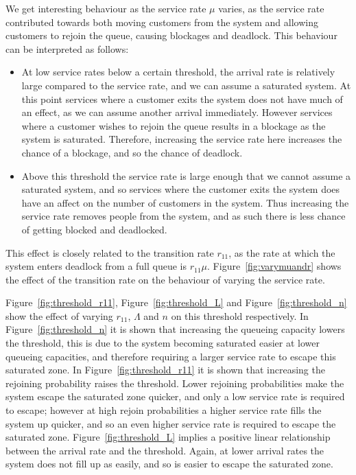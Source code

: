 \documentclass{article}
\begin{document}
We get interesting behaviour as the service rate $\mu$ varies, as the service rate contributed towards both moving customers from the system and allowing customers to rejoin the queue, causing blockages and deadlock.
This behaviour can be interpreted as follows:
\begin{itemize}
\item At low service rates below a certain threshold, the arrival rate is relatively large compared to the service rate, and we can assume a saturated system.
At this point services where a customer exits the system does not have much of an effect, as we can assume another arrival immediately.
However services where a customer wishes to rejoin the queue results in a blockage as the system is saturated.
Therefore, increasing the service rate here increases the chance of a blockage, and so the chance of deadlock.
\item Above this threshold the service rate is large enough that we cannot assume a saturated system, and so services where the customer exits the system does have an affect on the number of customers in the system.
Thus increasing the service rate removes people from the system, and as such there is less chance of getting blocked and deadlocked.
\end{itemize}

This effect is closely related to the transition rate $r_{11}$, as the rate at which the system enters deadlock from a full queue is $r_{11}\mu$.
Figure~\ref{fig:varymuandr} shows the effect of the transition rate on the behaviour of varying the service rate.

Figure~\ref{fig:threshold_r11}, Figure~\ref{fig:threshold_L} and Figure~\ref{fig:threshold_n} show the effect of varying $r_{11}$, $\Lambda$ and $n$ on this threshold respectively.
In Figure~\ref{fig:threshold_n} it is shown that increasing the queueing capacity lowers the threshold, this is due to the system becoming saturated easier at lower queueing capacities, and therefore requiring a larger service rate to escape this saturated zone.
In Figure~\ref{fig:threshold_r11} it is shown that increasing the rejoining probability raises the threshold.
Lower rejoining probabilities make the system escape the saturated zone quicker, and only a low service rate is required to escape; however at high rejoin probabilities a higher service rate fills the system up quicker, and so an even higher service rate is required to escape the saturated zone.
Figure~\ref{fig:threshold_L} implies a positive linear relationship between the arrival rate and the threshold.
Again, at lower arrival rates the system does not fill up as easily, and so is easier to escape the saturated zone.
\end{document}
